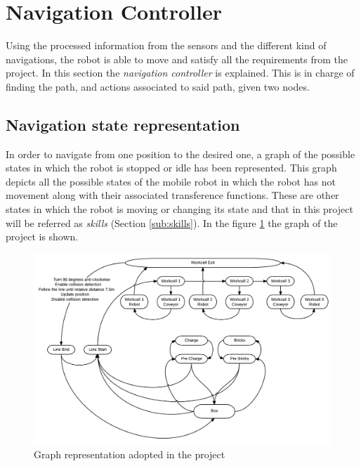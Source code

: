 \section{Navigation Controller} %
\label{sec:mr_navigation_controller}
Using the processed information from the sensors and the different kind of navigations, the robot is able to move and satisfy all the requirements from the project.
In this section the \emph{navigation controller} is explained.
This is in charge of finding the path, and actions associated to said path, given two nodes.

\subsection{Navigation state representation} %
    \label{sub:mr_navigation_state_representation}
    In order to navigate from one position to the desired one, a graph of the possible states in which the robot is stopped or idle has been represented.
    This graph depicts all the possible states of the mobile robot in which the robot has not movement along with their associated transference functions. 
    These are other states in which the robot is moving or changing its state and that in this project will be referred as \emph{skills} (Section \ref{sub:skills}).
    In the figure \ref{fig:mr_graph} the graph of the project is shown.
    
    \begin{figure}[H]
        \centering
        \includegraphics[width=\textwidth]{figs/mr_graph.pdf}
        \caption{Graph representation adopted in the project}
        \label{fig:mr_graph}
    \end{figure}

